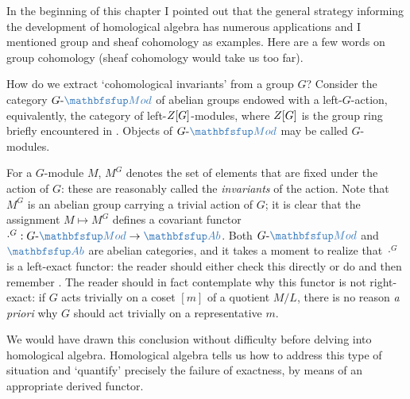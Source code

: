 In the beginning of this chapter I pointed out that the general
strategy informing the development of homological algebra has numerous
applications and I mentioned group and sheaf cohomology as
examples. Here are a few words on group cohomology (sheaf cohomology
would take us too far).

How do we extract `cohomological invariants' from a group $G$?
Consider the category $G\text{-}\categ{Mod}$ of abelian groups endowed
with a left-$G$-action, equivalently, the category of
left-$Z[G]$-modules, where $Z[G]$ is the group ring briefly
encountered in . Objects of
$G\text{-}\categ{Mod}$ may be called $G$-modules.

For a $G$-module $M$, $M^G$ denotes the set of elements that are fixed
under the action of $G$: these are reasonably called the
\emph{invariants} of the action. Note that $M^G$ is an abelian group
carrying a trivial action of $G$; it is clear that the assignment
$M \mapsto M^G$
defines a covariant functor
$\cdot^G : G\text{-}\categ{Mod} \to \categ{Ab}$. Both
$G\text{-}\categ{Mod}$ and $\categ{Ab}$ are abelian categories, and it
takes a moment to realize that $\cdot^G$ is a left-exact functor: the
reader should either check this directly or do
 and
then remember . The reader should in fact
contemplate why this functor is not right-exact: if $G$ acts trivially
on a coset $[m]$ of a quotient $M/L$, there is no reason \emph{a
  priori} why $G$ should act trivially on a representative $m$.

We would have drawn this conclusion without difficulty before delving
into homological algebra. Homological algebra tells us how to address
this type of situation and `quantify' precisely the failure of
exactness, by means of an appropriate derived functor.

